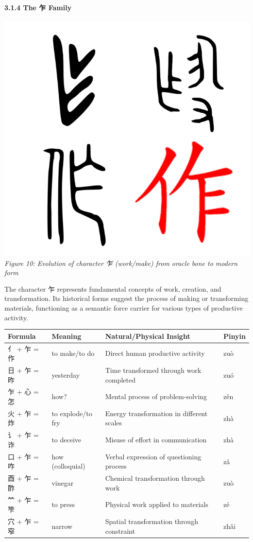 \hypertarget{the-ux4e4d-family}{%
\paragraph{3.1.4 The 乍 Family}\label{the-ux4e4d-family}}

\includegraphics{./images/zi_work.png} \emph{Figure 10: Evolution of
character 乍 (work/make) from oracle bone to modern form}

The character 乍 represents fundamental concepts of work, creation, and
transformation. Its historical forms suggest the process of making or
transforming materials, functioning as a semantic force carrier for
various types of productive activity.

\begin{longtable}[]{@{}llll@{}}
\toprule
Formula & Meaning & Natural/Physical Insight & Pinyin\tabularnewline
\midrule
\endhead
亻 + 乍 = 作 & to make/to do & Direct human productive activity &
zuò\tabularnewline
日 + 乍 = 昨 & yesterday & Time transformed through work completed &
zuó\tabularnewline
乍 + 心 = 怎 & how? & Mental process of problem-solving &
zěn\tabularnewline
火 + 乍 = 炸 & to explode/to fry & Energy transformation in different
scales & zhà\tabularnewline
讠 + 乍 = 诈 & to deceive & Misuse of effort in communication &
zhà\tabularnewline
口 + 乍 = 咋 & how (colloquial) & Verbal expression of questioning
process & zǎ\tabularnewline
酉 + 乍 = 酢 & vinegar & Chemical transformation through work &
zuò\tabularnewline
⺮ + 乍 = 笮 & to press & Physical work applied to materials &
zé\tabularnewline
穴 + 乍 = 窄 & narrow & Spatial transformation through constraint &
zhǎi\tabularnewline
\bottomrule
\end{longtable}


